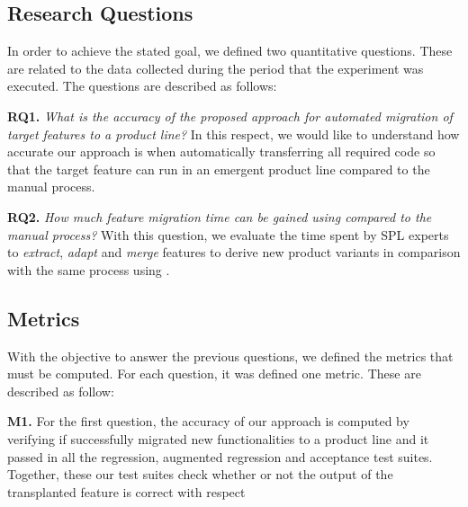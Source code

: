 \subsection{Research Questions}

In order to achieve the stated goal, we defined two quantitative questions. These are related to the data collected during the period that the experiment was executed. The questions are described as follows:

\textbf{RQ1.} \emph{What is the accuracy of the proposed approach for automated migration of target features to a product line?} In this respect, we would like to understand how accurate our approach is when automatically transferring all required code so that the target feature can run in an emergent product line compared to the manual process.

\textbf{RQ2.} \emph{How much feature migration time can be gained using \autoscalpel compared to the manual process?} With this question, we evaluate the time spent by SPL experts to \emph{extract}, \emph{adapt} and \emph{merge} features to derive new product variants in comparison with the same process using \autoscalpel. 

\subsection{Metrics}
With the objective to answer the previous questions, we defined the metrics that must be computed. For each question, it was defined one metric. These are described as follow:

\textbf{M1.} For the first question, the accuracy of our approach is computed by verifying if \autoscalpel successfully migrated new functionalities to a product line and it passed in all the regression, augmented regression and acceptance test suites. Together, these our test suites check whether or not the output of the transplanted feature is correct with respect 





